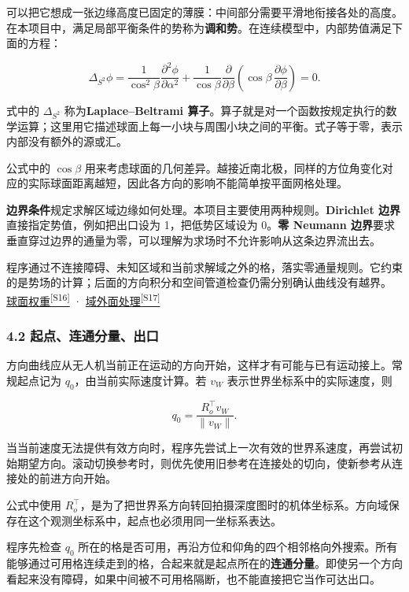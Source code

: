 \documentclass[11pt,a4paper]{article}
\numberwithin{equation}{topic}
\newcommand{\sourceref}[2]{\hyperlink{source-#1}{#2\textsuperscript{[#1]}}}
\begin{document}
可以把它想成一张边缘高度已固定的薄膜：中间部分需要平滑地衔接各处的高度。在本项目中，满足局部平衡条件的势称为\textbf{调和势}。在连续模型中，内部势值满足下面的方程：

\begin{equation}
\label{eq:laplace}
\Delta_{S^2}\phi
=\frac{1}{\cos^2\beta}\frac{\partial^2\phi}{\partial\alpha^2}
+\frac{1}{\cos\beta}\frac{\partial}{\partial\beta}
\left(\cos\beta\,\frac{\partial\phi}{\partial\beta}\right)=0.
\end{equation}

式中的 \(\Delta_{S^2}\) 称为\textbf{Laplace–Beltrami 算子}。算子就是对一个函数按规定执行的数学运算；这里用它描述球面上每一小块与周围小块之间的平衡。式子等于零，表示内部没有额外的源或汇。

公式中的 \(\cos\beta\) 用来考虑球面的几何差异。越接近南北极，同样的方位角变化对应的实际球面距离越短，因此各方向的影响不能简单按平面网格处理。

\textbf{边界条件}规定求解区域边缘如何处理。本项目主要使用两种规则。\textbf{Dirichlet 边界}直接指定势值，例如把出口设为 1，把低势区域设为 0。\textbf{零 Neumann 边界}要求垂直穿过边界的通量为零，可以理解为求场时不允许影响从这条边界流出去。

程序通过不连接障碍、未知区域和当前求解域之外的格，落实零通量规则。它约束的是势场的计算；后面的方向积分和空间管道检查仍需分别确认曲线没有越界。 \sourceref{S16}{球面权重} · \sourceref{S17}{域外面处理}

\subsubsection*{4.2 起点、连通分量、出口}

方向曲线应从无人机当前正在运动的方向开始，这样才有可能与已有运动接上。常规起点记为 \(q_0\)，由当前实际速度计算。若 \(v_W\) 表示世界坐标系中的实际速度，则

\begin{equation}
\label{eq:start}
q_0=\frac{R_o^\top v_W}{\|v_W\|}.
\end{equation}

当当前速度无法提供有效方向时，程序先尝试上一次有效的世界系速度，再尝试初始期望方向。滚动切换参考时，则优先使用旧参考在连接处的切向，使新参考从连接处的前进方向开始。

公式中使用 \(R_o^\top\)，是为了把世界系方向转回拍摄深度图时的机体坐标系。方向域保存在这个观测坐标系中，起点也必须用同一坐标系表达。

程序先检查 \(q_0\) 所在的格是否可用，再沿方位和仰角的四个相邻格向外搜索。所有能够通过可用格连续走到的格，合起来就是起点所在的\textbf{连通分量}。即使另一个方向看起来没有障碍，如果中间被不可用格隔断，也不能直接把它当作可达出口。
\end{document}
